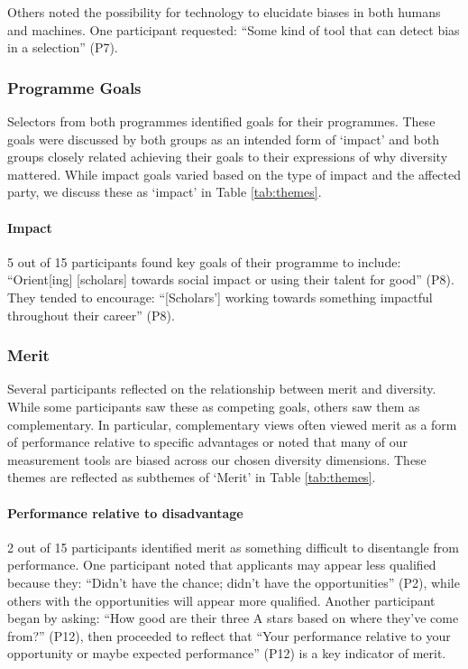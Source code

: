 Others noted the possibility for technology to elucidate biases in both humans and machines. One participant requested: ``Some kind of tool that can detect bias in a selection'' (P7).

\subsubsection{Programme Goals}
Selectors from both programmes identified goals for their programmes. These goals were discussed by both groups as an intended form of `impact' and both groups closely related achieving their goals to their expressions of why diversity mattered. While impact goals varied based on the type of impact and the affected party, we discuss these as `impact' in Table \ref{tab:themes}.

\paragraph{Impact}
5 out of 15 participants found key goals of their programme to include: ``Orient[ing] [scholars] towards social impact or using their talent for good'' (P8). They tended to encourage: ``[Scholars'] working towards something impactful throughout their career'' (P8).

\subsubsection{Merit}
Several participants reflected on the relationship between merit and diversity. While some participants saw these as competing goals, others saw them as complementary. In particular, complementary views often viewed merit as a form of performance relative to specific advantages or noted that many of our measurement tools are biased across our chosen diversity dimensions. These themes are reflected as subthemes of `Merit' in Table \ref{tab:themes}.

\paragraph{Performance relative to disadvantage}
2 out of 15 participants identified merit as something difficult to disentangle from performance. One participant noted that applicants may appear less qualified because they: ``Didn't have the chance; didn't have the opportunities'' (P2), while others with the opportunities will appear more qualified. Another participant began by asking: ``How good are their three A stars based on where they've come from?'' (P12), then proceeded to reflect that ``Your performance relative to your opportunity or maybe expected performance'' (P12) is a key indicator of merit.


